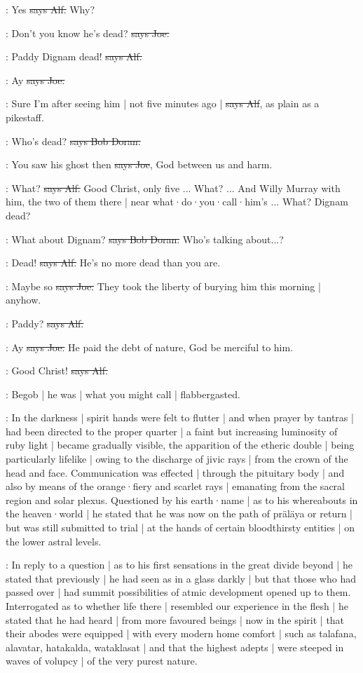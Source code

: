 \bergan:
Yes
\sout{says Alf.}
Why?

\joe:
Don't you know he's dead?
\sout{says Joe.}

\bergan:
Paddy Dignam dead!
\sout{says Alf.}

\joe:
Ay
\sout{says Joe.}

\bergan:
Sure I'm after seeing him |
not five minutes ago |
\sout{says Alf},
as plain as a pikestaff.

\doran:
Who's dead?
\sout{says Bob Doran.}

\joe:
You saw his ghost then
\sout{says Joe},
God between us and harm.

\bergan:
What?
\sout{says Alf.}
Good Christ,
only five ...
What?
...
And Willy Murray with him,
the two of them there |
near what·do·you·call·him's ...
What?
Dignam dead?

\doran:
What about Dignam?
\sout{says Bob Doran.}
Who's talking about...?

\bergan:
Dead!
\sout{says Alf.}
He's no more dead than you are.

\joe:
Maybe so
\sout{says Joe.}
They took the liberty of burying him this morning |
anyhow.

\bergan:
Paddy?
\sout{says Alf.}

\joe:
Ay
\sout{says Joe.}
He paid the debt of nature,
God be merciful to him.

\bergan:
Good Christ!
\sout{says Alf.}

\Nq:
Begob |
he was |
what you might call |
flabbergasted.

:
In the darkness |
spirit hands were felt to flutter |
and when prayer by tantras |
had been directed to the proper quarter |
a faint but increasing luminosity of ruby light |
became gradually visible,
the apparition of the etheric double |
being particularly lifelike |
owing to the discharge of jivic rays |
from the crown of the head and face.
Communication was effected |
through the pituitary body |
and also by means of the orange·fiery and scarlet rays |
emanating from the sacral region and solar plexus.
Questioned by his earth·name |
as to his whereabouts in the heaven·world |
he stated that he was now on the path of präläya or return |
but was still submitted to trial |
at the hands of certain bloodthirsty entities |
on the lower astral levels.

:
In reply to a question |
as to his first sensations in the great divide beyond |
he stated that previously |
he had seen as in a glass darkly |
but that those who had passed over
 |
had summit possibilities of atmic development opened up to them.
Interrogated as to whether life there |
resembled our experience in the flesh |
he stated that he had heard |
from more favoured beings |
now in the spirit |
that their abodes were equipped |
with every modern home comfort |
such as talafana,
alavatar,
hatakalda,
wataklasat |
and that the highest adepts |
were steeped in waves of volupcy |
of the very purest nature.

